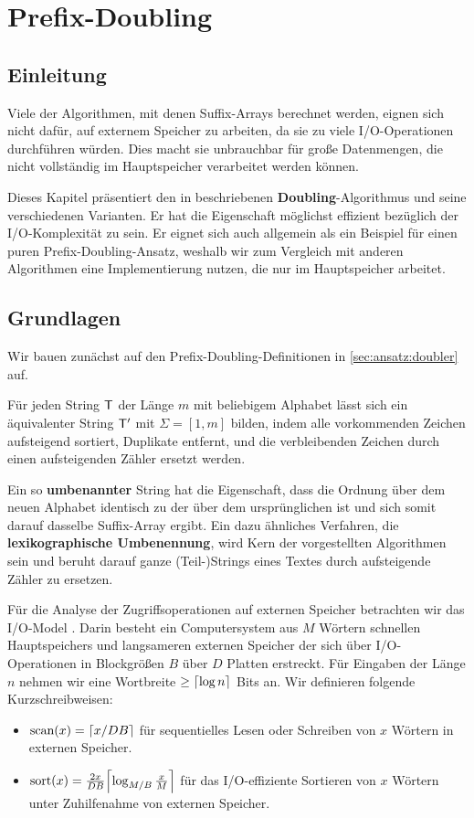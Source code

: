 \section{Prefix-Doubling}

\subsection{Einleitung}

Viele  der Algorithmen, mit denen Suffix-Arrays berechnet werden, eignen sich nicht dafür, auf externem Speicher zu arbeiten, da sie zu viele I/O-Operationen durchführen würden. Dies macht sie unbrauchbar für große Datenmengen, die nicht vollständig im Hauptspeicher verarbeitet werden können.

Dieses Kapitel präsentiert den in \cite{saca:11} beschriebenen \textbf{Doubling}-Algorithmus und seine verschiedenen Varianten. Er hat die Eigenschaft möglichst effizient bezüglich der I/O-Komplexität zu sein. Er eignet sich auch allgemein als ein Beispiel für einen puren Prefix-Doubling-Ansatz, weshalb wir zum Vergleich mit anderen Algorithmen eine Implementierung nutzen, die nur im Hauptspeicher arbeitet.

\subsection{Grundlagen}

Wir bauen zunächst auf den Prefix-Doubling-Definitionen in \cref{sec:ansatz:doubler} auf. 

Für jeden String $\inputtext$ der Länge $m$ mit beliebigem Alphabet lässt sich ein äquivalenter String $\inputtext'$ mit $\Sigma = [1, m]$ bilden, indem alle vorkommenden Zeichen aufsteigend sortiert, Duplikate entfernt, und die verbleibenden Zeichen durch einen aufsteigenden Zähler ersetzt werden. 

Ein so \textbf{umbenannter} String hat die Eigenschaft, dass die Ordnung über dem neuen Alphabet identisch zu der über dem ursprünglichen ist und sich somit darauf dasselbe Suffix-Array ergibt. Ein dazu ähnliches Verfahren, die \textbf{lexikographische Umbenennung}, wird Kern der vorgestellten Algorithmen sein und beruht darauf ganze (Teil-)Strings eines Textes durch aufsteigende Zähler zu ersetzen.

Für die Analyse der Zugriffsoperationen auf externen Speicher betrachten wir das I/O-Model \cite{Vitter1994}. Darin besteht ein Computersystem aus $M$ Wörtern schnellen Hauptspeichers und langsameren externen Speicher der sich über I/O-Operationen in Blockgrößen $B$ über $D$ Platten erstreckt. Für Eingaben der Länge $n$ nehmen wir eine Wortbreite $\geq \ceil*{\log n}$ Bits an. Wir definieren folgende Kurzschreibweisen:
\begin{itemize}
\item $\text{scan}(x) = \ceil*{x/DB}$ für sequentielles Lesen oder Schreiben von $x$ Wörtern in externen Speicher.
\item $\text{sort}(x) = \frac{2x}{DB}\ceil*{\log_{M/B}\frac{x}{M}}$ für das I/O-effiziente Sortieren von $x$ Wörtern unter Zuhilfenahme von externen Speicher.
\end{itemize}

